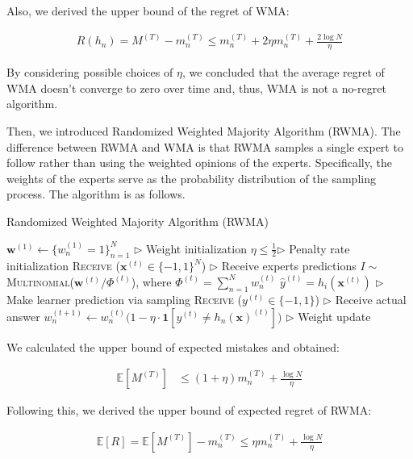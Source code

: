 \documentclass[11pt]{article}
\begin{document}
Also, we derived the upper bound of the regret of WMA:

\begin{align}
    R(h_n) = M^{(T)} - m_n^{(T)} \leq m_n^{(T)} + 2\eta m_n^{(T)} + \frac{2\log N}{\eta}
\end{align}

By considering possible choices of $\eta$, we concluded that the average regret of WMA doesn't converge to zero over time and, thus, WMA is not a no-regret algorithm.

Then, we introduced Randomized Weighted Majority Algorithm (RWMA). The difference between RWMA and WMA is that RWMA samples a single expert to follow rather than using the weighted opinions of the experts. Specifically, the weights of the experts serve as the probability distribution of the sampling process. The algorithm is as follows.

\begin{algorithm}[H]
\caption{Randomized Weighted Majority Algorithm (RWMA)}
\label{algo:rwma}
\begin{algorithmic}[1]
\STATE $\textbf{w}^{(1)} \leftarrow \{w_n^{(1)}=1\}_{n=1}^N$ \hfill $\triangleright$ Weight initialization
\STATE $\eta\leq\frac{1}{2}$\hfill $\triangleright$ Penalty rate initialization
\STATE \textsc{Receive} ($\textbf{x}^{(t)}\in\{-1, 1\}^N$) \hfill $\triangleright$ Receive experts predictions
\STATE $I\sim$ \textsc{Multinomial}($\textbf{w}^{(t)}/\Phi^{(t)}$), where $\Phi^{(t)}=\sum_{n=1}^Nw_n^{(t)}$
\STATE $\hat{y}^{(t)}=h_i(\textbf{x}^{(t)})$ \hfill $\triangleright$ Make learner prediction via sampling
\STATE \textsc{Receive} ($y^{(t)}\in\{-1, 1\}$) \hfill $\triangleright$ Receive actual answer
\STATE $w_n^{(t+1)}\leftarrow w_n^{(t)}\big(1-\eta\cdot\textbf{1}[y^{(t)}\neq h_n(\textbf{x})^{(t)}]\big)$ \hfill $\triangleright$ Weight update
\ENDFOR
\end{algorithmic}
\end{algorithm}

We calculated the upper bound of expected mistakes and obtained:

\begin{align*}
    \mathbb{E}[M^{(T)}]&\leq (1+\eta)m_n^{(T)} + \frac{\log N}{\eta}
\end{align*}

Following this, we derived the upper bound of expected regret of RWMA:

\begin{align}
    \mathbb{E}[R] = \mathbb{E}[M^{(T)}] - m_n^{(T)} \leq \eta m_n^{(T)} + \frac{\log N}{\eta} \label{eq:rwma_final}
\end{align}
\end{document}
